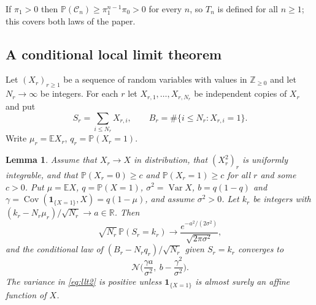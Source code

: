 \documentclass[11pt]{amsart}
\newtheorem{lemma}[theorem]{Lemma}
\theoremstyle{definition}
\newcommand{\R}{\mathbb{R}}
\newcommand{\Z}{\mathbb{Z}}
\newcommand{\E}{\mathbb{E}}
\newcommand{\Prob}{\mathbb{P}}
\newcommand{\Nor}{\mathcal{N}}
\newcommand{\Cond}{\mathcal{C}}
\newcommand{\Ind}{\mathbf{1}}
\DeclareMathOperator{\Var}{Var}
\DeclareMathOperator{\Cov}{Cov}
\begin{document}
If $\pi_1>0$ then $\Prob(\Cond_n)\ge\pi_1^{n-1}\pi_0>0$ for every $n$, so $T_n$ is defined for all $n\ge1$; this covers both laws of the paper.

\subsection{A conditional local limit theorem}

Let $(X_r)_{r\ge1}$ be a sequence of random variables with values in $\Z_{\ge0}$ and let $N_r\to\infty$ be integers. For each $r$ let $X_{r,1},\dots,X_{r,N_r}$ be independent copies of $X_r$ and put
\[
S_r=\sum_{i\le N_r}X_{r,i},\qquad B_r=\#\{i\le N_r:X_{r,i}=1\}.
\]
Write $\mu_r=\E X_r$, $q_r=\Prob(X_r=1)$.

\begin{lemma}\label{lem:llt}
Assume that $X_r\to X$ in distribution, that $(X_r^2)_r$ is uniformly integrable, and that $\Prob(X_r=0)\ge c$ and $\Prob(X_r=1)\ge c$ for all $r$ and some $c>0$. Put $\mu=\E X$, $q=\Prob(X=1)$, $\sigma^2=\Var X$, $b=q(1-q)$ and $\gamma=\Cov(\Ind_{\{X=1\}},X)=q(1-\mu)$, and assume $\sigma^2>0$. Let $k_r$ be integers with $(k_r-N_r\mu_r)/\sqrt{N_r}\to a\in\R$. Then
\begin{equation}\label{eq:llt1}
\sqrt{N_r}\,\Prob(S_r=k_r)\longrightarrow\frac{e^{-a^2/(2\sigma^2)}}{\sqrt{2\pi\sigma^2}},
\end{equation}
and the conditional law of $(B_r-N_rq_r)/\sqrt{N_r}$ given $S_r=k_r$ converges to
\begin{equation}\label{eq:llt2}
\Nor\Big(\frac{\gamma a}{\sigma^2},\ b-\frac{\gamma^2}{\sigma^2}\Big).
\end{equation}
The variance in \eqref{eq:llt2} is positive unless $\Ind_{\{X=1\}}$ is almost surely an affine function of $X$.
\end{lemma}
\end{document}
